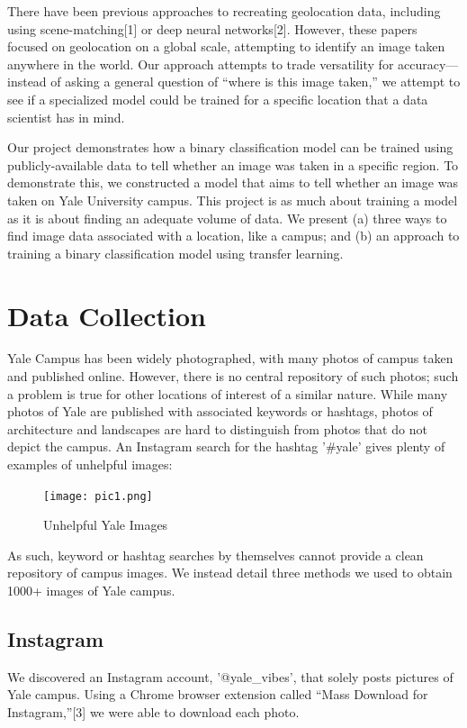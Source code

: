 \documentclass[letterpaper]{article} %
\begin{document}
There have been previous approaches to recreating geolocation data, including using scene-matching[1] or deep neural networks[2]. However, these papers focused on geolocation on a global scale, attempting to identify an image taken anywhere in the world. Our approach attempts to trade versatility for accuracy—instead of asking a general question of “where is this image taken,” we attempt to see if a specialized model could be trained for a specific location that a data scientist has in mind.

Our project demonstrates how a binary classification model can be trained using publicly-available data to tell whether an image was taken in a specific region. To demonstrate this, we constructed a model that aims to tell whether an image was taken on Yale University campus. This project is as much about training a model as it is about finding an adequate volume of data. We present (a) three ways to find image data associated with a location, like a campus; and (b) an approach to training a binary classification model using transfer learning.

\section{Data Collection}
Yale Campus has been widely photographed, with many photos of campus taken and published online. However, there is no central repository of such photos; such a problem is true for other locations of interest of a similar nature. While many photos of Yale are published with associated keywords or hashtags, photos of architecture and landscapes are hard to distinguish from photos that do not depict the campus. An Instagram search for the hashtag '\#yale' gives plenty of examples of unhelpful images:

\begin{figure}
    \centering
    \texttt{[image: pic1.png]}
    \caption{Unhelpful Yale Images}
    \label{fig:enter-label}
\end{figure}

As such, keyword or hashtag searches by themselves cannot provide a clean repository of campus images. We instead detail three methods we used to obtain 1000+ images of Yale campus.


\subsection{Instagram}
We discovered an Instagram account, '@yale\_vibes', that solely posts pictures of Yale campus. Using a Chrome browser extension called “Mass Download for Instagram,”[3] we were able to download each photo.
\end{document}
